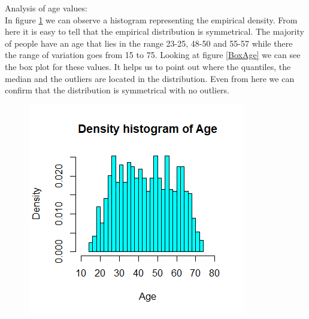 \newpage
Analysis of age values: \\
In figure \ref{HistAge} we can observe a histogram representing the empirical density. From here it is easy to tell that the empirical distribution is symmetrical. The majority of people have an age that lies in the range 23-25, 48-50 and 55-57 while there the range of variation goes from 15 to 75. Looking at figure \ref{BoxAge} we can see the box plot for these values. It helps us to point out where the quantiles, the median and the outliers are located in the distribution. Even from here we can confirm that the distribution is symmetrical with no outliers. \\
\begin{figure}[ht!]
\centering
\begin{minipage}{.5\textwidth}
  \centering
  \includegraphics[width=1\linewidth]{root/Hist_age.png}
  \label{HistAge}
\end{minipage}%
\begin{minipage}{.5\textwidth}
  \centering

\end{minipage}
\end{figure}

